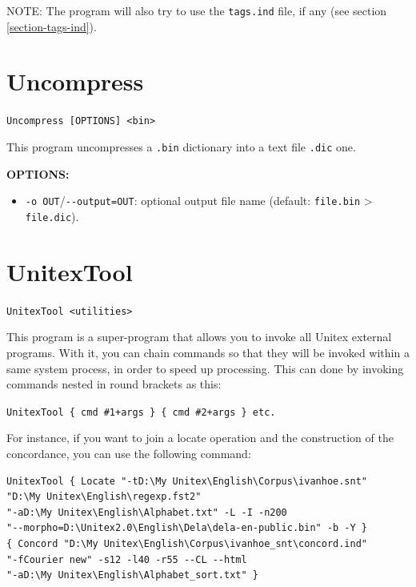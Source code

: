 \bigskip
\noindent NOTE: The program will also try to use the \verb+tags.ind+ file, if
any (see section \ref{section-tags-ind}).







\section{Uncompress}
\label{section-Uncompress}
\verb+Uncompress [OPTIONS] <bin>+

\bigskip
\noindent This program uncompresses a \verb+.bin+ dictionary into a text file
\verb+.dic+ one.

\bigskip
\noindent \textbf{OPTIONS:}
\begin{itemize}
  \item \verb+-o OUT+/\verb+--output=OUT+: optional output file name (default:
  \verb+file.bin+ > \verb+file.dic+).
\end{itemize}








\section{UnitexTool}
\label{section-UnitexTool}
\verb+UnitexTool <utilities>+

\bigskip
\noindent This program is a super-program that allows you to invoke all Unitex
external programs. With it, you can chain commands so that they will be invoked
within a same system process, in order to speed up processing. This can done by
invoking commands nested in round brackets as this:

\bigskip
\noindent \verb$UnitexTool { cmd #1+args } { cmd #2+args } etc.$

\bigskip
\noindent For instance, if you want to join a locate operation and the
construction of the concordance, you can use the following command:

\bigskip
\begin{verbatim}
UnitexTool { Locate "-tD:\My Unitex\English\Corpus\ivanhoe.snt" 
"D:\My Unitex\English\regexp.fst2"
"-aD:\My Unitex\English\Alphabet.txt" -L -I -n200 
"--morpho=D:\Unitex2.0\English\Dela\dela-en-public.bin" -b -Y }
{ Concord "D:\My Unitex\English\Corpus\ivanhoe_snt\concord.ind" 
"-fCourier new" -s12 -l40 -r55 --CL --html 
"-aD:\My Unitex\English\Alphabet_sort.txt" }
\end{verbatim}










